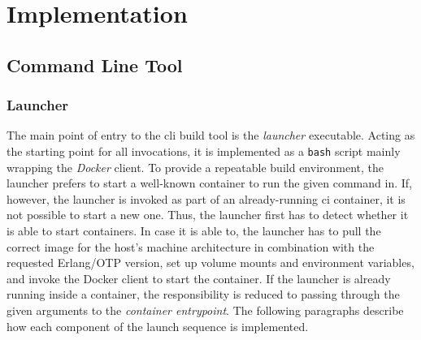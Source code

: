 \section{Implementation}

\subsection{Command Line Tool}

\subsubsection{Launcher} The main point of entry to the \acrshort{cli} build tool is the \emph{launcher} executable. Acting as the starting point for all invocations, it is implemented as a \lstinline|bash| script mainly wrapping the \emph{Docker} client. To provide a repeatable build environment, the launcher prefers to start a well-known container to run the given command in. If, however, the launcher is invoked as part of an already-running \acrshort{ci} container, it is not possible to start a new one. Thus, the launcher first has to detect whether it is able to start containers. In case it is able to, the launcher has to pull the correct image for the host's machine architecture in combination with the requested Erlang/OTP version, set up volume mounts and environment variables, and invoke the Docker client to start the container. If the launcher is already running inside a container, the responsibility is reduced to passing through the given arguments to the \emph{container entrypoint}. The following paragraphs describe how each component of the launch sequence is implemented.

